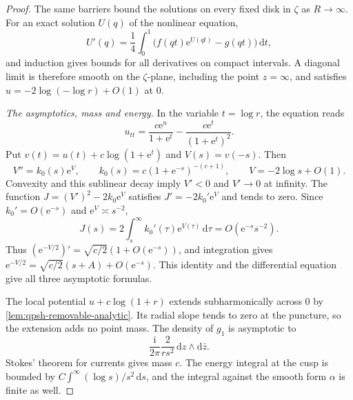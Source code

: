 \begin{proof}
The same barriers bound the solutions on every fixed disk in $\zeta$ as $R\to\infty$. For an exact solution $U(q)$ of the nonlinear equation,
\[
 U'(q)=\frac14\int_0^1\bigl(f(qt)\mathrm{e}^{U(qt)}-g(qt)\bigr)\,\mathrm{d}t,
\]
and induction gives bounds for all derivatives on compact intervals. A diagonal limit is therefore smooth on the $\zeta$-plane, including the point $z=\infty$, and satisfies $u=-2\log(-\log r)+O(1)$ at $0$.

\emph{The asymptotics, mass and energy.}
In the variable $t=\log r$, the equation reads
\[
 u_{tt}=\frac{c\mathrm{e}^{u}}{1+\mathrm{e}^t}
              -\frac{c\mathrm{e}^t}{(1+\mathrm{e}^t)^2}.
\]
Put $v(t)=u(t)+c\log(1+\mathrm{e}^t)$ and $V(s)=v(-s)$. Then
\[
 V''=k_0(s)\mathrm{e}^{V},\qquad
 k_0(s)=c(1+\mathrm{e}^{-s})^{-(c+1)},\qquad
 V=-2\log s+O(1).
\]
Convexity and this sublinear decay imply $V'<0$ and $V'\to0$ at infinity. The function $J=(V')^2-2k_0\mathrm{e}^{V}$ satisfies $J'=-2k_0'\mathrm{e}^{V}$ and tends to zero. Since $k_0'=O(\mathrm{e}^{-s})$ and $\mathrm{e}^{V}\asymp s^{-2}$,
\[
 J(s)=2\int_s^\infty k_0'(\tau)\mathrm{e}^{V(\tau)}\,\mathrm{d}\tau
       =O(\mathrm{e}^{-s}s^{-2}).
\]
Thus $(\mathrm{e}^{-V/2})'=\sqrt{c/2}(1+O(\mathrm{e}^{-s}))$, and integration gives $\mathrm{e}^{-V/2}=\sqrt{c/2}(s+A)+O(\mathrm{e}^{-s})$. This identity and the differential equation give all three asymptotic formulas.

The local potential $u+c\log(1+r)$ extends subharmonically across $0$ by \cref{lem:qpsh-removable-analytic}. Its radial slope tends to zero at the puncture, so the extension adds no point mass. The density of $g_1$ is asymptotic to
\[
 \frac{\mathrm{i}}{2\pi}\frac{2}{r s^2}
          \,\mathrm{d}z\wedge\mathrm{d}\bar z.
\]
Stokes' theorem for currents gives mass $c$. The energy integral at the cusp is bounded by $C\int^\infty(\log s)/s^2\,\mathrm{d}s$, and the integral against the smooth form $\alpha$ is finite as well.
\end{proof}

